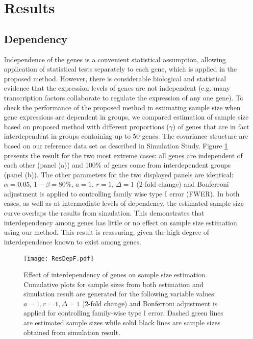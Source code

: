 \documentclass[12pt]{article}
\begin{document}
\section{Results}

\subsection{Dependency}

Independence of the genes is a convenient statistical assumption,
allowing application of statistical tests separately to each gene,
which is applied in the proposed method.  However, there is
considerable biological and statistical evidence that the
expression levels of genes are not independent (e.g. many
transcription factors collaborate to regulate the expression of
any one gene). To check the performance of the proposed method in
estimating sample size when gene expressions are dependent in
groups, we compared estimation of sample size based on proposed
method with different proportions ($\gamma$) of genes that are in
fact interdependent in groups containing up to 50 genes. The
covariance structure are based on our reference data set as
described in Simulation Study. Figure \ref{fig:ResDep} presents
the result for the two most extreme cases: all genes are
independent of each other (panel (a)) and 100\% of genes come from
interdependent groups (panel (b)). The other parameters for the
two displayed panels are identical: $\alpha = 0.05$, $1 - \beta =
80\%$, $a = 1$, $r = 1$, $\Delta = 1$ (2-fold change) and Bonferroni
adjustment is applied to controlling family wise type I error
(FWER). In both cases, as well as at intermediate levels of
dependency, the
estimated sample size curve overlaps the results from simulation.
This demonstrates that interdependency among genes has little or
no effect on sample size estimation using our method. This result
is reassuring, given the high degree of interdependence known to
exist among genes.

\begin{figure}%
  \caption[Effect of interdependency of genes on sample size
    estimation] {Effect of interdependency of genes on sample size
    estimation.  Cumulative plots for sample sizes from both
    estimation and simulation result are generated for the following
    variable values: $a = 1, r = 1, \Delta = 1$ (2-fold change) and
    Bonferroni adjustment is applied for controlling family-wise type I
    error. Dashed green lines are estimated sample sizes while solid
    black lines are sample sizes obtained from simulation result.}
  \label{fig:ResDep}
  \centerline{\texttt{[image: ResDepF.pdf]}}
\end{figure}
\end{document}

